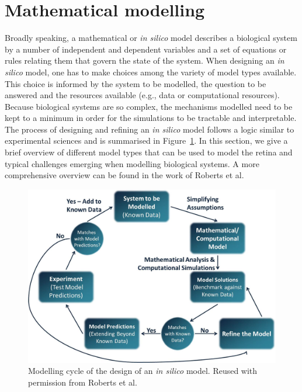 \documentclass[12pt,a4paper]{article}
\begin{document}
\section*{Mathematical modelling}

Broadly speaking, a mathematical or \textit{in silico} model describes a biological system by a number of independent and dependent variables and a set of equations or rules relating them that govern the state of the system.
When designing an \textit{in silico} model, one has to make choices among the variety of model types available.
This choice is informed by the system to be modelled, the question to be answered and the resources available (e.g., data or computational resources).
Because biological systems are so complex, the mechanisms modelled need to be kept to a minimum in order for the simulations to be tractable and interpretable.
The process of designing and refining an \textit{in silico} model follows a logic similar to experimental sciences and is summarised in Figure~\ref{fig:ModellingCycle}.
In this section, we give a brief overview of different model types that can be used to model the retina and typical challenges emerging when modelling biological systems.
A more comprehensive overview can be found in the work of Roberts et al.\cite{Roberts_2016}

\begin{figure}[ht!]
  \centering
  \includegraphics[width=.9\linewidth]{ModellingCycle}
  \caption{Modelling cycle of the design of an \textit{in silico} model. Reused with permission from Roberts et al.\cite{Roberts_2016}}
  \label{fig:ModellingCycle}
\end{figure}
\end{document}
